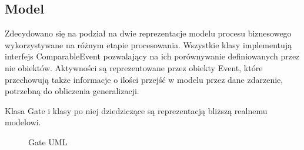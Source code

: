 \subsection{Model}

Zdecydowano się na podział na dwie reprezentacje modelu procesu biznesowego wykorzystywane na różnym etapie procesowania. Wszystkie klasy implementują interfejs ComparableEvent pozwalający na ich porównywanie definiowanych przez nie obiektów. Aktywności są reprezentowane przez obiekty Event, które przechowują także informacje o ilości przejść w modelu przez dane zdarzenie, potrzebną do obliczenia generalizacji.  

Klasa Gate i klasy po niej dziedziczące są reprezentacją bliższą realnemu modelowi. 

\begin{figure}[h]
	\caption{\label{fig:subcaption_example}Gate UML}
\end{figure}

